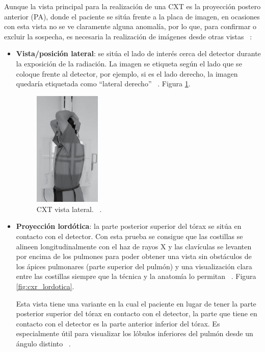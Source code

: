 Aunque la vista principal para la realización de una CXT es la proyección postero anterior (PA), donde el paciente se sitúa frente a la placa de imagen, en ocasiones con esta vista no se ve claramente alguna anomalía, por lo que, para confirmar o excluir la sospecha, es necesaria la realización de imágenes desde otras vistas ~\cite{gelaw15}:
\begin{itemize}
    \item \textbf{Vista/posición lateral}: se sitúa el lado de interés cerca del detector durante la exposición de la radiación. La imagen se etiqueta según el lado que se coloque frente al detector, por ejemplo, si es el lado derecho, la imagen quedaría etiquetada como ``lateral derecho'' ~\cite{gelaw15}. Figura \ref{fig:CXR_vista_lateral}.
    
    \begin{figure}[!h]
        \centering
        \includegraphics[width=0.30\textwidth]{img/CXR_vista_lateral.PNG}
        \caption{CXT vista lateral. ~\cite{gelaw15}.}
        \label{fig:CXR_vista_lateral}
    \end{figure}
    \FloatBarrier

    \item \textbf{Proyección lordótica}: la parte posterior superior del tórax se sitúa en contacto con el detector. Con esta prueba se consigue que las costillas se alineen longitudinalmente con el haz de rayos X y las clavículas se levanten por encima de los pulmones para poder obtener una vista sin obstáculos de los ápices pulmonares (parte superior del pulmón) y una visualización clara entre las costillas siempre que la técnica y la anatomía lo permitan ~\cite{gelaw15}. Figura \ref{fig:cxr_lordotica}.
    
    Esta vista tiene una variante en la cual el paciente en lugar de tener la parte posterior superior del tórax en contacto con el detector, la parte que tiene en contacto con el detector es la parte anterior inferior del tórax. Es especialmente útil para visualizar los lóbulos inferiores del pulmón desde un ángulo distinto ~\cite{gelaw15}.


\end{itemize}

